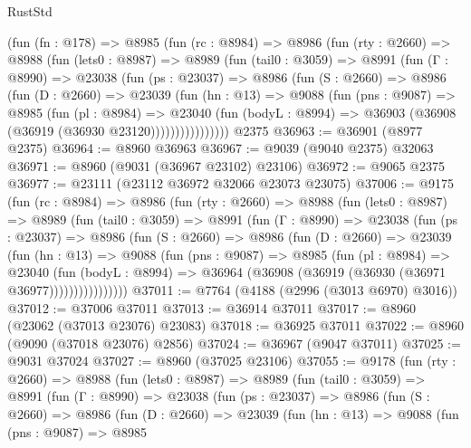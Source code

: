 \begin{lexlean}{RustStd}
\begin{coremodule}
    (fun (fn : @178) =>
    @8985
      (fun (rc : @8984) =>
      @8986
        (fun (rty : @2660) =>
        @8988
          (fun (lets0 : @8987) =>
          @8989
            (fun (tail0 : @3059) =>
            @8991
              (fun (Γ : @8990) =>
              @23038
                (fun (ps : @23037) =>
                @8986
                  (fun (S : @2660) =>
                  @8986
                    (fun (D : @2660) =>
                    @23039
                      (fun (hn : @13) =>
                      @9088
                        (fun (pns : @9087) =>
                        @8985
                          (fun (pl : @8984) =>
                          @23040
                            (fun (bodyL : @8994) =>
                            @36903 (@36908 (@36919 (@36930 @23120))))))))))))))))
    @2375
@36963 := @36901 (@8977 @2375)
@36964 := @8960 @36963
@36967 := @9039 (@9040 @2375) @32063
@36971 := @8960 (@9031 (@36967 @23102) @23106)
@36972 := @9065 @2375
@36977 := @23111 (@23112 @36972 @32066 @23073 @23075)
@37006 := @9175
    (fun (rc : @8984) =>
    @8986
      (fun (rty : @2660) =>
      @8988
        (fun (lets0 : @8987) =>
        @8989
          (fun (tail0 : @3059) =>
          @8991
            (fun (Γ : @8990) =>
            @23038
              (fun (ps : @23037) =>
              @8986
                (fun (S : @2660) =>
                @8986
                  (fun (D : @2660) =>
                  @23039
                    (fun (hn : @13) =>
                    @9088
                      (fun (pns : @9087) =>
                      @8985
                        (fun (pl : @8984) =>
                        @23040
                          (fun (bodyL : @8994) =>
                          @36964 (@36908 (@36919 (@36930 (@36971 @36977))))))))))))))))
@37011 := @7764 (@4188 (@2996 (@3013 @6970) @3016))
@37012 := @37006 @37011
@37013 := @36914 @37011
@37017 := @8960 (@23062 (@37013 @23076) @23083)
@37018 := @36925 @37011
@37022 := @8960 (@9090 (@37018 @23076) @2856)
@37024 := @36967 (@9047 @37011)
@37025 := @9031 @37024
@37027 := @8960 (@37025 @23106)
@37055 := @9178
    (fun (rty : @2660) =>
    @8988
      (fun (lets0 : @8987) =>
      @8989
        (fun (tail0 : @3059) =>
        @8991
          (fun (Γ : @8990) =>
          @23038
            (fun (ps : @23037) =>
            @8986
              (fun (S : @2660) =>
              @8986
                (fun (D : @2660) =>
                @23039
                  (fun (hn : @13) =>
                  @9088
                    (fun (pns : @9087) =>
                    @8985

\end{coremodule}
\end{lexlean}
